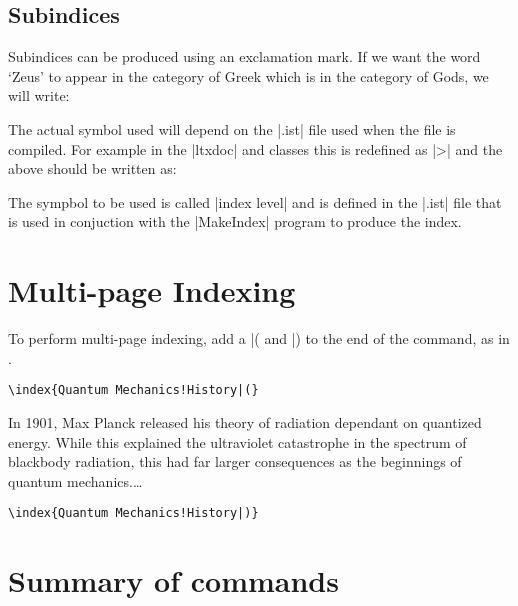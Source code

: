 \begin{multicols}{2}
\subsection{Subindices}
Subindices can be produced using an exclamation mark. If we want the word `Zeus'
to appear in the category of Greek which is in the category of Gods, we will write:

\begin{sverbatim}
\end{sverbatim}

The actual symbol used will depend on the |.ist| file used when the file is compiled. For example in the |ltxdoc| and  classes this is redefined as |>| and the above should be written as:

\begin{sverbatim}
\end{sverbatim}

The sympbol to be used is called |index level| and is defined in the |.ist| file that is used in conjuction with the |MakeIndex| program to produce the index.

\section{Multi-page Indexing}

To perform multi-page indexing, add a |( and |) to the end of the \cmd{\index} command, as in 
.

{\small
\verb+\index{Quantum Mechanics!History|(}+

\narrower\narrower
In 1901, Max Planck released his theory of radiation dependant 
on quantized energy. While this explained the ultraviolet catastrophe
 in the spectrum of blackbody radiation, this had far larger consequences 
as the beginnings of quantum mechanics.\ldots

\verb+\index{Quantum Mechanics!History|)}+
}

\end{multicols}



\section{Summary of commands}

